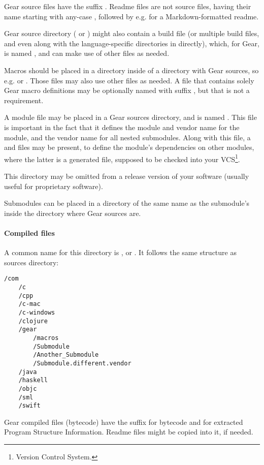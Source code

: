 Gear source files have the suffix . Readme files are not source files, having their name starting with any-case , followed by e.g.  for a Markdown-formatted readme. 

Gear source directory ( or ) might also contain a build file (or multiple build files, and even along with the language-specific directories in  directly), which, for Gear, is named , and can make use of other files as needed. 

Macros should be placed in a  directory inside of a directory with Gear sources, so e.g.  or . Those files may also use other files as needed. A file that contains solely Gear macro definitions may be optionally named with suffix , but that is not a requirement. 

A module file may be placed in a Gear sources directory, and is named . This file is important in the fact that it defines the module and vendor name for the module, and the vendor name for all nested submodules. Along with this file, a  and  files may be present, to define the module's dependencies on other modules, where the latter is a generated file, supposed to be checked into your VCS\footnote{Version Control System.}.

This directory may be omitted from a release version of your software (usually useful for proprietary software). 

Submodules can be placed in a directory of the same name as the submodule's inside the directory where Gear sources are. 

\paragraph{Compiled files}
A common name for this directory is , or . It follows the same structure as sources directory:
\begin{lstlisting}
/com
    /c
    /cpp
    /c-mac
    /c-windows
    /clojure
    /gear
        /macros
        /Submodule
        /Another_Submodule
        /Submodule.different.vendor
    /java
    /haskell
    /objc
    /sml
    /swift
\end{lstlisting}

Gear compiled files (bytecode) have the suffix  for bytecode and  for extracted Program Structure Information. Readme files might be copied into it, if needed. 

